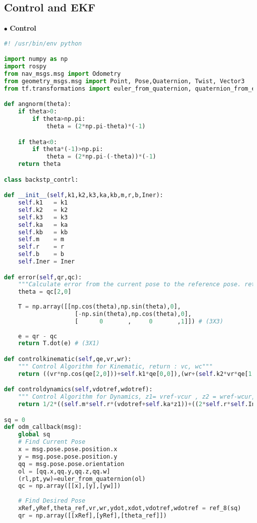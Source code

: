 \begin{appendices}
\section{Control and EKF}
$\bullet$ \textbf{Control}\par
\begin{lstlisting}[language=Python]
#! /usr/bin/env python

import numpy as np
import rospy
from nav_msgs.msg import Odometry
from geometry_msgs.msg import Point, Pose,Quaternion, Twist, Vector3
from tf.transformations import euler_from_quaternion, quaternion_from_euler

def angnorm(theta):
	if theta>0:
		if theta>np.pi:
			theta = (2*np.pi-theta)*(-1)

	if theta<0:
		if theta*(-1)>np.pi:
			theta = (2*np.pi-(-theta))*(-1)
	return theta

class backstp_contrl:

def __init__(self,k1,k2,k3,ka,kb,m,r,b,Iner):
	self.k1   = k1
	self.k2   = k2
	self.k3   = k3
	self.ka   = ka
	self.kb   = kb
	self.m    = m
	self.r    = r
	self.b    = b
	self.Iner = Iner

def error(self,qr,qc):
	"""Calculate error from the current pose to the reference pose. return qe"""
	theta = qc[2,0]
	
	T = np.array([[np.cos(theta),np.sin(theta),0],
					[-np.sin(theta),np.cos(theta),0],
					[      0       ,     0       ,1]]) # (3X3)
	
	e = qr - qc
	return T.dot(e) # (3X1)

def controlkinematic(self,qe,vr,wr):
	""" Control Algorithm for Kinematic, return : vc, wc"""
	return ((vr*np.cos(qe[2,0]))+self.k1*qe[0,0]),(wr+(self.k2*vr*qe[1,0])*(self.k3*np.sin(qe[2,0])))

def controldynamics(self,vdotref,wdotref):
	""" Control Algorithm for Dynamics, z1= vref-vcur , z2 = wref-wcur, return : tua1c, tua2c """
	return 1/2*((self.m*self.r*(vdotref+self.ka*z1))+((2*self.r*self.Iner/b)*(wdotref+self.kb*z2))),1/2*((self.m*self.r*(vdotref+self.ka*z1))-((2*self.r*self.Iner/b)*(wdotref+self.kb*z2)))

sq = 0
def odm_callback(msg):
	global sq
	# Find Current Pose
	x = msg.pose.pose.position.x
	y = msg.pose.pose.position.y
	qq = msg.pose.pose.orientation
	ol = [qq.x,qq.y,qq.z,qq.w]
	(rl,pt,yw)=euler_from_quaternion(ol)
	qc = np.array([[x],[y],[yw]])
	
	# Find Desired Pose
	xRef,yRef,theta_ref,vr,wr,ydot,xdot,vdotref,wdotref = ref_8(sq)
	qr = np.array([[xRef],[yRef],[theta_ref]])
	

\end{lstlisting}
\end{appendices}
